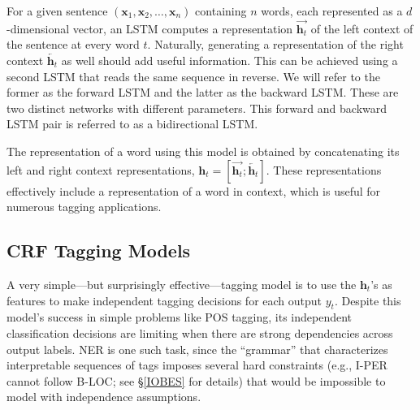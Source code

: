 For a given sentence $(\mathbf{x}_1, \mathbf{x}_2, \ldots, \mathbf{x}_n)$ containing $n$ words, each represented as a $d$-dimensional vector, an LSTM computes a representation $\overrightarrow{\mathbf{h}_t}$ of the left context of the sentence at every word $t$. Naturally, generating a representation of the right context $\overleftarrow{\mathbf{h}_t}$ as well should add useful information. This can be achieved using a second LSTM that reads the same sequence in reverse. We will refer to the former as the forward LSTM and the latter as the backward LSTM. These are two distinct networks with different parameters. This forward and backward LSTM pair is referred to as a bidirectional LSTM.

The representation of a word using this model is obtained by concatenating its left and right context representations, $\mathbf{h}_{t} = [\overrightarrow{\mathbf{h}_{t}} ; \overleftarrow{\mathbf{h}_{t}}]$. These representations effectively include a representation of a word in context, which is useful for numerous tagging applications.

\subsection{CRF Tagging Models}
\label{sec:crf}

A very simple---but surprisingly effective---tagging model is to use the $\mathbf{h}_t$'s as features to make independent tagging decisions for each output $y_t$. Despite this model's success in simple problems like POS tagging, its independent classification decisions are limiting when there are strong dependencies across output labels. NER is one such task, since the ``grammar'' that characterizes interpretable sequences of tags imposes several hard constraints (e.g., I-PER cannot follow B-LOC; see \S\ref{IOBES} for details) that would be impossible to model with independence assumptions.

